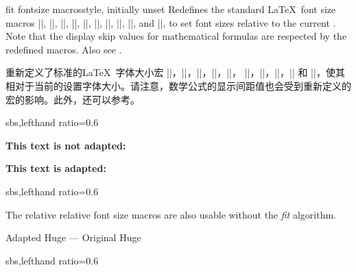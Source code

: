  
\begin{docTcbKey}{fit fontsize macros}{}{style, initially unset}
Redefines the standard \LaTeX\ font size macros
|\tiny|, |\scriptsize|, |\footnotesize|, |\small|, |\normalsize|,
|\large|, |\Large|, |\LARGE|, |\huge|, and |\Huge|,
to set font sizes relative to
the current . Note that the display skip values for
mathematical formulas are respected by the redefined macros.
Also see .

重新定义了标准的\LaTeX\ 字体大小宏
|\tiny|，|\scriptsize|，|\footnotesize|，|\small|，|\normalsize|，
|\large|，|\Large|，|\LARGE|，|\huge| 和 |\Huge|，使其相对于当前的设置字体大小。请注意，数学公式的显示间距值也会受到重新定义的宏的影响。此外，还可以参考。
\begin{dispExample*}{sbs,lefthand ratio=0.6}

\begin{tcolorbox}[fit to height=4cm]
  {\Large\bfseries This text is
             not adapted:\par}
  \lipsum[2]
\end{tcolorbox}

\begin{tcolorbox}[fit to height=4cm,
  fit fontsize macros ]
  {\Large\bfseries This text is adapted:\par}
  \lipsum[2]
\end{tcolorbox}
\end{dispExample*}

\begin{dispExample*}{sbs,lefthand ratio=0.6}

\let\realHuge=\Huge

\begin{tcolorbox}[fit basedim=7pt,
  fontupper=\normalsize,
  fit fontsize macros]
The relative relative font size macros
are also usable without the
\textit{fit} algorithm.\par
{\Huge Adapted Huge} ---
{\realHuge Original Huge}
\end{tcolorbox}

\end{dispExample*}


\begin{dispExample*}{sbs,lefthand ratio=0.6}

\tcboxfit[height=5cm,
  fit fontsize macros,
  fonttitle=\normalsize\bfseries,
  title=Adapted title]
{\lipsum[2]}

\end{dispExample*}
\end{docTcbKey}
